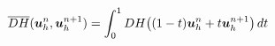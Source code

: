 \documentclass[preview]{standalone}
\newcommand{\bu}{\boldsymbol{u}_h}
\begin{document}
\begin{align*}
\special{dvisvgm:raw <g id='unique000'>}\overline{DH}(\bu^n,\bu^{n+1})=\int_0^1 DH\big((1-t)\bu^n+t\bu^{n+1}\big)\,dt\special{dvisvgm:raw </g>}
\end{align*}
\end{document}
